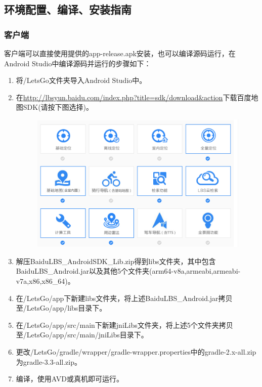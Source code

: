 \documentclass[UTF8]{article}
\begin{document}
\subsection{环境配置、编译、安装指南}
\subsubsection{客户端}
客户端可以直接使用提供的app-release.apk安装，也可以编译源码运行，在Android Studio中编译源码并运行的步骤如下：
\begin{enumerate}
    \item 将/LetsGo文件夹导入Android Studio中。
    \item 在\url{http://lbsyun.baidu.com/index.php?title=sdk/download\&action}下载百度地图SDK(请按下图选择)。
    \begin{figure}[H]
    \center
    \includegraphics[width=\textwidth]{images/baiduAPI.png}
    \end{figure}
    \item 解压BaiduLBS\_AndroidSDK\_Lib.zip得到libs文件夹，其中包含BaiduLBS\_Android.jar以及其他5个文件夹(arm64-v8a,armeabi,armeabi-v7a,x86,x86\_64)。
    \item 在/LetsGo/app下新建libs文件夹，将上述BaiduLBS\_Android.jar拷贝至/LetsGo/app/libs目录下。
    \item 在/LetsGo/app/src/main下新建jniLibs文件夹，将上述5个文件夹拷贝至/LetsGo/app/src/main/jniLibs目录下。
    \item 更改/LetsGo/gradle/wrapper/gradle-wrapper.properties中的gradle-2.x-all.zip为gradle-3.3-all.zip。
    \item 编译，使用AVD或真机即可运行。
\end{enumerate}
\end{document}
